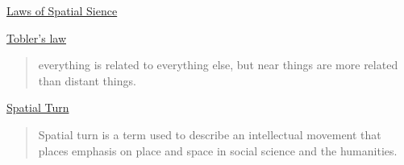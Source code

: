 \documentclass[ignorenonframetext,]{beamer}
\begin{document}
\begin{frame}{\href{http://de.slideshare.net/rheimann04/big-social-data-the-spatial-turn-in-big-data}{Laws
of Spatial Sience}}

\begin{block}{\href{https://en.wikipedia.org/wiki/Tobler's_first_law_of_geography}{Tobler's
law}}

\begin{quote}
everything is related to everything else, but near things are more
related than distant things.
\end{quote}

\end{block}

\begin{block}{\href{https://de.wikipedia.org/wiki/Spatial_turn}{Spatial
Turn}}

\begin{quote}
Spatial turn is a term used to describe an intellectual movement that
places emphasis on place and space in social science and the humanities.
\end{quote}

\end{block}

\end{frame}
\end{document}
